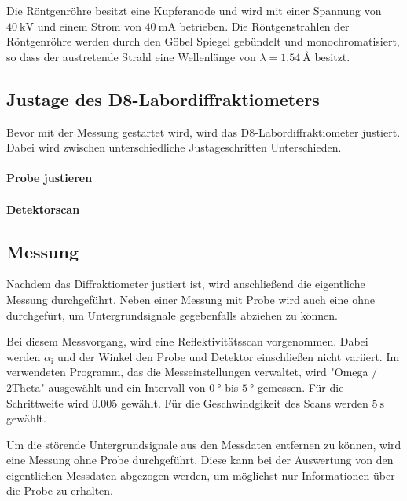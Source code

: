 Die Röntgenröhre besitzt eine Kupferanode und wird mit einer Spannung von $\SI{40}{\kilo\volt}$
und einem Strom von $\SI{40}{\milli\ampere}$ betrieben.
Die Röntgenstrahlen der Röntgenröhre werden durch den Göbel Spiegel
gebündelt und monochromatisiert,
so dass der austretende Strahl eine Wellenlänge von
$\lambda=\SI{1.54}{\angstrom}$ besitzt.


\subsection{Justage des D8-Labordiffraktiometers}
\label{subsec:justage}
Bevor mit der Messung gestartet wird, wird das D8-Labordiffraktiometer
justiert. Dabei wird zwischen unterschiedliche Justageschritten Unterschieden.


\paragraph{Probe justieren}


\paragraph{Detektorscan}
















\subsection{Messung}
\label{subsec:messung}
Nachdem das Diffraktiometer justiert ist, wird anschließend
die eigentliche Messung durchgeführt.
Neben einer Messung mit Probe wird auch eine ohne durchgefürt,
um Untergrundsignale gegebenfalls abziehen zu können.

Bei diesem Messvorgang, wird eine Reflektivitätsscan vorgenommen.
Dabei werden $\alpha_{\text{i}}$ und der Winkel den Probe und Detektor einschließen nicht
variiert. Im verwendeten Programm, das die Messeinstellungen verwaltet, wird
"Omega / 2Theta" ausgewählt und ein Intervall von $\SI{0}{\degree}$ bis
$\SI{5}{\degree}$ gemessen.
Für die Schrittweite wird 0.005 %
gewählt. Für die Geschwindgikeit des Scans werden $\SI{5}{\second}$ gewählt.


Um die störende Untergrundsignale aus den Messdaten entfernen zu können,
wird eine Messung ohne Probe durchgeführt. Diese kann bei der Auswertung
von den eigentlichen Messdaten abgezogen werden, um möglichst nur
Informationen über die Probe zu erhalten.
